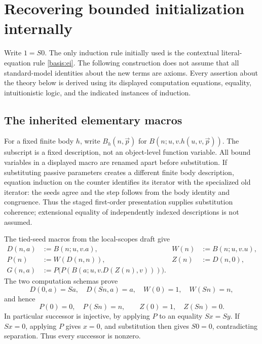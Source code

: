 \section{Recovering bounded initialization internally}
\label{sec:internal-bounded-initialization}

Write $1=S0$.  The only induction rule initially used is the contextual
literal-equation rule \eqref{basis:ei}.  The following construction
does not assume that all standard-model identities about the new terms
are axioms.  Every assertion about the theory below is derived using
its displayed computation equations, equality, intuitionistic logic,
and the indicated instances of induction.

\subsection{The inherited elementary macros}

For a fixed finite body $h$, write $B_h(n,\vec p)$ for
$B(n;u,v.h(u,v,\vec p))$.  The subscript is a fixed description, not
an object-level function variable.  All bound variables in a displayed
macro are renamed apart before substitution. If substituting passive
parameters creates a different finite body description, equation induction
on the counter identifies its iterator with the specialized old iterator:
the seeds agree and the step follows from the body identity and congruence.
Thus the staged first-order presentation supplies substitution coherence;
extensional equality of independently indexed descriptions is not assumed.

The tied-seed macros from the local-scopes draft give
\begin{align*}
 D(n,a)&:=B(n;u,v.a),& W(n)&:=B(n;u,v.u),\\
 P(n)&:=W(D(n,n)),& Z(n)&:=D(n,0),\\
 G(n,a)&:=P\bigl(P(B(a;u,v.D(Z(n),v)))\bigr).
\end{align*}
The two computation schemas prove
\[
 D(0,a)=Sa,\quad D(Sn,a)=a,\quad
 W(0)=1,\quad W(Sn)=n,
\]
and hence
\[
             P(0)=0,\quad P(Sn)=n,
             \qquad Z(0)=1,\quad Z(Sn)=0.
 \tag{P,Z}\label{eq:ib-PZ}
\]
In particular successor is injective, by applying $P$ to an equality
$Sx=Sy$.  If $Sx=0$, applying $P$ gives $x=0$, and substitution then
gives $S0=0$, contradicting separation.  Thus every successor is nonzero.


